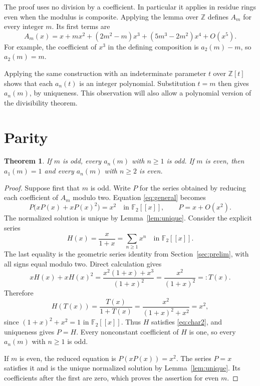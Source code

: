 \documentclass[11pt,a4paper]{article}
\newtheorem{theorem}{Theorem}[section]
\theoremstyle{remark}
\newcommand{\Z}{\mathbb Z}
\newcommand{\F}{\mathbb F}
\begin{document}
The proof uses no division by a coefficient. In particular it applies in
residue rings even when the modulus is composite. Applying the lemma over
$\Z$ defines $A_m$ for every integer $m$. Its first terms are
\begin{equation}\label{eq:first}
 A_m(x)=x+mx^2+(2m^2-m)x^3+(5m^3-2m^2)x^4+O(x^5).
\end{equation}
For example, the coefficient of $x^3$ in the defining composition is
$a_2(m)-m$, so $a_2(m)=m$.

Applying the same construction with an indeterminate parameter $t$ over
$\Z[t]$ shows that each $a_n(t)$ is an integer polynomial. Substitution
$t=m$ then gives $a_n(m)$, by uniqueness. This observation will also allow
a polynomial version of the divisibility theorem.

\section{Parity}

\begin{theorem}\label{thm:parity}
If $m$ is odd, every $a_n(m)$ with $n\ge1$ is odd. If $m$ is even, then
$a_1(m)=1$ and every $a_n(m)$ with $n\ge2$ is even.
\end{theorem}

\begin{proof}
Suppose first that $m$ is odd. Write $P$ for the series obtained by reducing
each coefficient of $A_m$ modulo two. Equation \eqref{eq:general} becomes
\begin{equation}\label{eq:char2}
 P\bigl(xP(x)+xP(x)^2\bigr)=x^2
 \quad\text{in }\F_2[[x]],\qquad P=x+O(x^2).
\end{equation}
The normalized solution is unique by Lemma~\ref{lem:unique}.
Consider the explicit series
\[
 H(x)=\frac{x}{1+x}=\sum_{n\ge1}x^n\quad\text{in }\F_2[[x]].
\]
The last equality is the geometric series identity from
Section~\ref{sec:prelim}, with all signs equal modulo two.
Direct calculation gives
\[
 xH(x)+xH(x)^2
 =\frac{x^2(1+x)+x^3}{(1+x)^2}
 =\frac{x^2}{(1+x)^2}=:T(x).
\]
Therefore
\[
 H(T(x))=\frac{T(x)}{1+T(x)}
 =\frac{x^2}{(1+x)^2+x^2}=x^2,
\]
since $(1+x)^2+x^2=1$ in $\F_2[[x]]$.
Thus $H$ satisfies \eqref{eq:char2}, and uniqueness gives $P=H$.
Every nonconstant coefficient of $H$ is one, so every $a_n(m)$ with
$n\ge1$ is odd.

If $m$ is even, the reduced equation is $P(xP(x))=x^2$.
The series $P=x$ satisfies it and is the unique normalized solution by
Lemma~\ref{lem:unique}. Its coefficients after the first are zero,
which proves the assertion for even $m$.
\end{proof}
\end{document}
